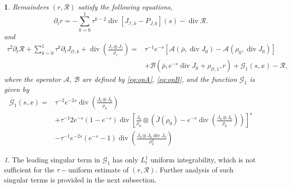 \documentclass[english]{amsart}
\theoremstyle{plain}
\theoremstyle{definition}
\theoremstyle{remark}
\newtheorem{rem}[thm]{\protect\remarkname}
\theoremstyle{plain}
\theoremstyle{plain}
\newtheorem{prop}[thm]{\protect\propositionname}
\theoremstyle{plain}
\providecommand{\propositionname}{Proposition}
\providecommand{\remarkname}{Remark}
\def\d{{\partial}}
\DeclareMathOperator{\diver}{div}
\numberwithin{equation}{section}
\begin{document}
\begin{prop}
Remainders $(r,\mathcal{R})$ satisfy the following equations,
\begin{equation}\label{eq:dtr}
\d_t r=-\sum_{k=0}^1\tau^{k-2} \diver [J_{\mathcal{I},k}-P_{J,k}](s)-\diver\mathcal{R}.
\end{equation}
and
\begin{equation}\label{eq:dtR}
\begin{aligned}
\tau^2\d_t\mathcal{R}+\sum_{k=0}^1 \tau^{k}\d_t J_{\mathcal{O},k}+\diver\left(\frac{J_\tau\otimes J_\tau}{\rho_\tau}\right)=&\tau^{-1} e^{-s}[\mathcal{A}(\bar\rho,\diver J_0)-\mathcal{A}(\rho_0,\diver J_0)]\\
&+\mathcal{B}(\bar\rho,e^{-s}\diver J_0+\rho_{\mathcal{O},1},r)+\mathcal{G}_1(s,x)-\mathcal{R},
\end{aligned}
\end{equation}
where the operator $\mathcal{A}$, $\mathcal{B}$ are defined by \eqref{eq:opA}, \eqref{eq:opB}, and the function $\mathcal{G}_1$ is given by
\begin{align*}
\mathcal{G}_1(s,x)=&\tau^{-2}e^{-2s}\diver \left(\frac{J_0\otimes J_0}{\rho_0}\right)\\
&+\tau^{-1}2e^{-s}(1-e^{-s})\diver \left[\frac{J_0}{\rho_0}\otimes\left(\bar J(\rho_0)-e^{-s}\diver \left(\frac{J_0\otimes J_0}{\rho_0}\right)\right)\right]^s\\
&-\tau^{-1}e^{-2s}(e^{-s}-1)\diver\left(\frac{J_0\otimes J_0\diver J_0}{\rho_0^2}\right)
\end{align*}
\end{prop}

\begin{rem}
The leading singular term in $\mathcal{G}_1$ has only $L^1_t$ uniform integrability, which is not sufficient for the $\tau-$uniform estimate of $(r,\mathcal{R})$. Further analysis of such singular terms is provided in the next subsection.
\end{rem}
\end{document}
